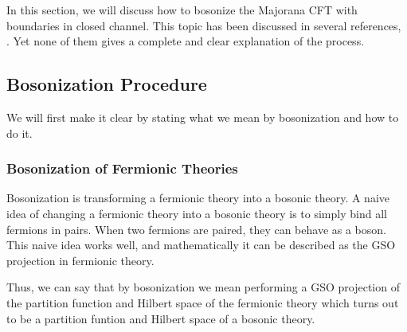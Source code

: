 In this section, we will discuss how to bosonize the Majorana CFT with boundaries in closed channel. This topic has been discussed in several references, \cite{horiNotesBosonizationBoundary2009, ebisuFermionizationConformalBoundary2021}. Yet none of them gives a complete and clear explanation of the process.

\subsection{Bosonization Procedure}

We will first make it clear by stating what we mean by bosonization and how to do it.

\subsubsection{Bosonization of Fermionic Theories}
Bosonization is transforming a fermionic theory into a bosonic theory. A naive idea of changing a fermionic theory into a bosonic theory is to simply bind all fermions in pairs. When two fermions are paired, they can behave as a boson. This naive idea works well, and mathematically it can be described as the GSO projection in fermionic theory.

Thus, we can say that by bosonization we mean performing a GSO projection of the partition function and Hilbert space of the fermionic theory which turns out to be a partition funtion and Hilbert space of a bosonic theory.

